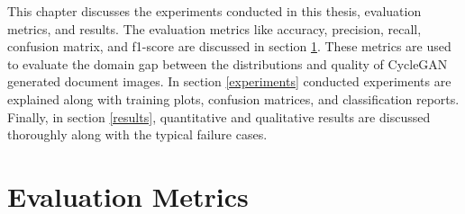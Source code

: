 \justifying
\setlength{\parskip}{1em}

This chapter discusses the experiments conducted in this thesis, evaluation metrics, and results. The evaluation metrics like accuracy, precision, recall, confusion matrix, and f1-score are discussed in section \ref{EvaluationMetrics}. These metrics are used to evaluate the domain gap between the distributions and quality of \ac{CycleGAN} generated document images. In section \ref{experiments} conducted experiments are explained along with training plots, confusion matrices, and classification reports. Finally, in section \ref{results}, quantitative and qualitative results are discussed thoroughly along with the typical failure cases.

\section{Evaluation Metrics}\label{EvaluationMetrics}



